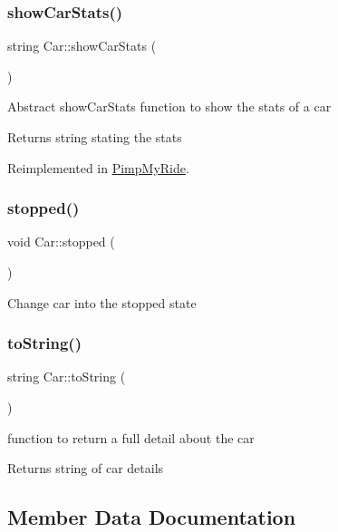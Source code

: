 \subsubsection{\texorpdfstring{show\+Car\+Stats()}{showCarStats()}}
{\footnotesize\ttfamily string Car\+::show\+Car\+Stats (\begin{DoxyParamCaption}{ }\end{DoxyParamCaption})\hspace{0.3cm}{\ttfamily [virtual]}}

Abstract show\+Car\+Stats function to show the stats of a car \begin{DoxyReturn}{Returns}
string stating the stats 
\end{DoxyReturn}


Reimplemented in \mbox{\hyperlink{class_pimp_my_ride_afd1a51b17959c3476d2ead62325d026e}{Pimp\+My\+Ride}}.

\mbox{\label{class_car_a5e1e788c983d40dfe465f0a536d58d47}} 
\subsubsection{\texorpdfstring{stopped()}{stopped()}}
{\footnotesize\ttfamily void Car\+::stopped (\begin{DoxyParamCaption}{ }\end{DoxyParamCaption})}

Change car into the stopped state \mbox{\label{class_car_a7989fe6e09bb5dfc1b7de3d5f275b5ae}} 
\subsubsection{\texorpdfstring{to\+String()}{toString()}}
{\footnotesize\ttfamily string Car\+::to\+String (\begin{DoxyParamCaption}{ }\end{DoxyParamCaption})}

function to return a full detail about the car \begin{DoxyReturn}{Returns}
string of car details 
\end{DoxyReturn}


\subsection{Member Data Documentation}
\mbox{\label{class_car_aceffd197450d95f4c6a15e38152b50a4}} 
